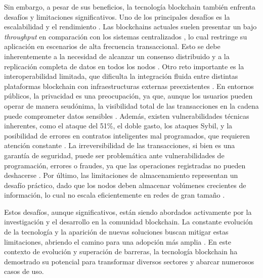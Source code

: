 Sin embargo, a pesar de sus beneficios, la tecnología blockchain también enfrenta desafíos y limitaciones significativos. Uno de los principales desafíos es la escalabilidad y el rendimiento \cite{tripathi2023comprehensive}. Las blockchains actuales suelen presentar un bajo \textit{throughput} en comparación con los sistemas centralizados \cite{baralla2023waste}, lo cual restringe su aplicación en escenarios de alta frecuencia transaccional. Esto se debe inherentemente a la necesidad de alcanzar un consenso distribuido y a la replicación completa de datos en todos los nodos \cite{tripathi2023comprehensive}. Otro reto importante es la interoperabilidad limitada, que dificulta la integración fluida entre distintas plataformas blockchain con infraestructuras externas preexistentes \cite{tripathi2023comprehensive}. En entornos públicos, la privacidad es una preocupación, ya que, aunque los usuarios pueden operar de manera seudónima, la visibilidad total de las transacciones en la cadena puede comprometer datos sensibles \cite{diez2023web, rennock2018blockchain}. Además, existen vulnerabilidades técnicas inherentes, como el ataque del 51\%, el doble gasto, los ataques Sybil, y la posibilidad de errores en contratos inteligentes mal programados, que requieren atención constante \cite{diez2023web}. La irreversibilidad de las transacciones, si bien es una garantía de seguridad, puede ser problemática ante vulnerabilidades de programación, errores o fraudes, ya que las operaciones registradas no pueden deshacerse \cite{taherdoost2023smart}. Por último, las limitaciones de almacenamiento representan un desafío práctico, dado que los nodos deben almacenar volúmenes crecientes de información, lo cual no escala eficientemente en redes de gran tamaño \cite{taherdoost2023smart}.

Estos desafíos, aunque significativos, están siendo abordados activamente por la investigación y el desarrollo en la comunidad blockchain. La constante evolución de la tecnología y la aparición de nuevas soluciones buscan mitigar estas limitaciones, abriendo el camino para una adopción más amplia \cite{tripathi2023comprehensive, baralla2023waste, taherdoost2023smart}. En este contexto de evolución y superación de barreras, la tecnología blockchain ha demostrado su potencial para transformar diversos sectores y abarcar numerosos casos de uso.


